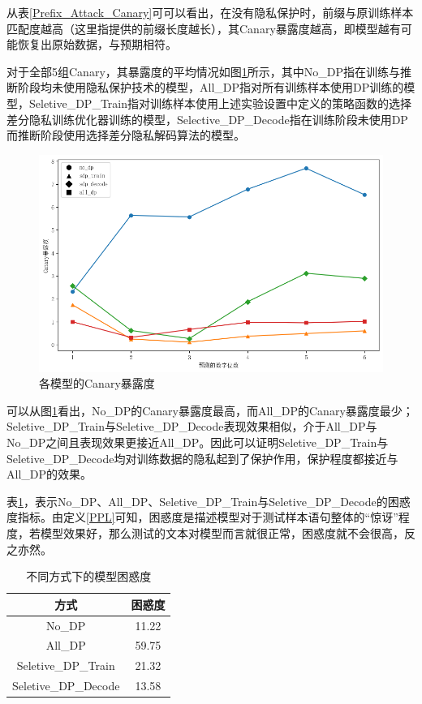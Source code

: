 从表\ref{Prefix_Attack_Canary}可可以看出，在没有隐私保护时，前缀与原训练样本匹配度越高（这里指提供的前缀长度越长），其Canary暴露度越高，即模型越有可能恢复出原始数据，与预期相符。

对于全部5组Canary，其暴露度的平均情况如图\ref{Chap5_DP_Canary_Res}所示，其中No\_DP指在训练与推断阶段均未使用隐私保护技术的模型，All\_DP指对所有训练样本使用DP训练的模型，Seletive\_DP\_Train指对训练样本使用上述实验设置中定义的策略函数的选择差分隐私训练优化器训练的模型，Selective\_DP\_Decode指在训练阶段未使用DP而推断阶段使用选择差分隐私解码算法的模型。

\begin{figure}[h]
	\centering
	\includegraphics[width=\linewidth]{figures/Chap5_DP_Canary_Res.png}
	\caption{各模型的Canary暴露度}
	\label{Chap5_DP_Canary_Res}
\end{figure}

可以从图\ref{Chap5_DP_Canary_Res}看出，No\_DP的Canary暴露度最高，而All\_DP的Canary暴露度最少；Seletive\_DP\_Train与Seletive\_DP\_Decode表现效果相似，介于All\_DP与No\_DP之间且表现效果更接近All\_DP。因此可以证明Seletive\_DP\_Train与Seletive\_DP\_Decode均对训练数据的隐私起到了保护作用，保护程度都接近与All\_DP的效果。

表\ref{Chap5_Mode_PPL}，表示No\_DP、All\_DP、Seletive\_DP\_Train与Seletive\_DP\_Decode的困惑度指标。由定义\ref{PPL}可知，困惑度是描述模型对于测试样本语句整体的“惊讶”程度，若模型效果好，那么测试的文本对模型而言就很正常，困惑度就不会很高，反之亦然。

\begin{table}[]
	\centering
	\caption{不同方式下的模型困惑度}
	\begin{tabular}{|c|c|}
		\hline
		方式&困惑度   \\ \hline
		No\_DP&11.22    \\ \hline
		All\_DP&59.75    \\ \hline
		Seletive\_DP\_Train&21.32    \\ \hline
		Seletive\_DP\_Decode&13.58   \\ \hline
	\end{tabular}
	\label{Chap5_Mode_PPL}
\end{table}

